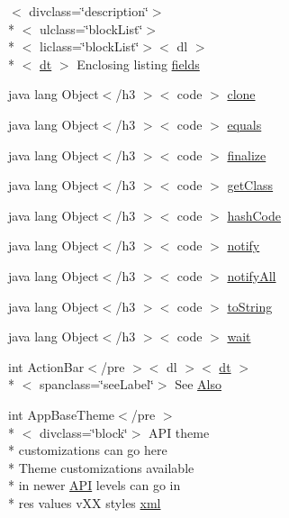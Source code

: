 \begin{DoxyCompactItemize}
$<$ divclass=\char`\"{}description\char`\"{}$>$\\*
$<$ ulclass=\char`\"{}block\-List\char`\"{}$>$\\*
$<$ liclass=\char`\"{}block\-List\char`\"{}$>$$<$ dl $>$\\*
$<$ \hyperlink{stylesheet_8css_a107565fb4039d33b041380d6e0ea1d80}{dt} $>$ Enclosing listing \hyperlink{_r_8style_8html_afd37662da3d7ed7360bf6b47123a9dec}{fields}
\item 
java lang Object$<$/h3 $>$$<$ code $>$ \hyperlink{_r_8style_8html_adc9607fcabf6f2d7f401ad52015ef6e0}{clone}
\item 
java lang Object$<$/h3 $>$$<$ code $>$ \hyperlink{_r_8style_8html_a8974318cea585f72df717e0380ec7104}{equals}
\item 
java lang Object$<$/h3 $>$$<$ code $>$ \hyperlink{_r_8style_8html_ab2315181ead4aeedef2374039b6ddde7}{finalize}
\item 
java lang Object$<$/h3 $>$$<$ code $>$ \hyperlink{_r_8style_8html_a98e6644727fe65eac217a6855045be43}{get\-Class}
\item 
java lang Object$<$/h3 $>$$<$ code $>$ \hyperlink{_r_8style_8html_a8e178e2bb2bef055ea23ea3910a221ca}{hash\-Code}
\item 
java lang Object$<$/h3 $>$$<$ code $>$ \hyperlink{_r_8style_8html_ae99ae10b5010594dbda4794e02db271b}{notify}
\item 
java lang Object$<$/h3 $>$$<$ code $>$ \hyperlink{_r_8style_8html_a1279357e6e09e33e75b55eb05fdb6436}{notify\-All}
\item 
java lang Object$<$/h3 $>$$<$ code $>$ \hyperlink{_r_8style_8html_a36e8a76a4132c9a7081416f27d087615}{to\-String}
\item 
java lang Object$<$/h3 $>$$<$ code $>$ \hyperlink{_r_8style_8html_a9a9f0c22e5688d478c707f910f1c1aea}{wait}
\item 
int Action\-Bar$<$/pre $>$$<$ dl $>$$<$ \hyperlink{stylesheet_8css_a107565fb4039d33b041380d6e0ea1d80}{dt} $>$\\*
$<$ spanclass=\char`\"{}see\-Label\char`\"{}$>$ See \hyperlink{_r_8style_8html_a66bd67a8343c2fc4489348d8afcd42ac}{Also}
\item 
int App\-Base\-Theme$<$/pre $>$\\*
$<$ divclass=\char`\"{}block\char`\"{}$>$ A\-P\-I theme \\*
customizations can go here \\*
Theme customizations available \\*
in newer \hyperlink{help-doc_8html_a7d3f9452f8a4b1b494eade1a77016691}{A\-P\-I} levels can go in \\*
res values v\-X\-X styles \hyperlink{_r_8style_8html_a35799d842f613907c3a5aaacad40c6c9}{xml}
\end{DoxyCompactItemize}


